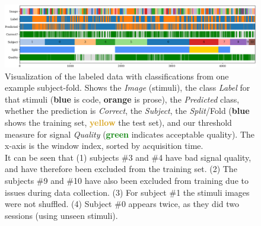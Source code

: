 \begin{figure}
    \centering
    \includegraphics[width=\linewidth]{img/timebars.png}
    \caption{Visualization of the labeled data with classifications from one example subject-fold. Shows the \emph{Image} (stimuli), the class \emph{Label} for that stimuli (\textcolor{NavyBlue}{\textbf{blue}} is code, \textcolor{BurntOrange}{\textbf{orange}} is prose), the \emph{Predicted} class, whether the prediction is \emph{Correct}, the \emph{Subject}, the \emph{Split}/Fold (\textcolor{NavyBlue}{\textbf{blue}} shows the training set, \textcolor{Goldenrod}{\textbf{yellow}} the test set), and our threshold measure for signal \emph{Quality} (\textcolor{Green}{\textbf{green}} indicates acceptable quality). The x-axis is the window index, sorted by acquisition time.
    \\
    \vspace{0.5em}
    It can be seen that (1) subjects \#3 and \#4 have bad signal quality, and have therefore been excluded from the training set. (2) The subjects \#9 and \#10 have also been excluded from training due to issues during data collection. (3) For subject \#1 the stimuli images were not shuffled. (4) Subject \#0 appears twice, as they did two sessions (using unseen stimuli).}\label{fig:timebars}
\end{figure}
